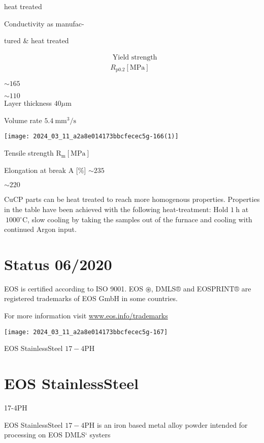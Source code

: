 \documentclass[10pt]{article}
\begin{document}
heat treated

Conductivity as manufac-

tured \& heat treated

$$
\begin{aligned}
& \text { Yield strength } \\
& R_{\mathrm{p} 0.2}[\mathrm{MPa}]
\end{aligned}
$$

$\sim 165$

$\sim 110$\\
Layer thickness $40 \mu \mathrm{m}$

Volume rate $5.4 \mathrm{~mm}^{3} / \mathrm{s}$

\begin{center}
\texttt{[image: 2024\_03\_11\_a2a8e014173bbcfecec5g-166(1)]}
\end{center}

Tensile strength $\mathrm{R}_{\mathrm{m}}[\mathrm{MPa}]$

Elongation at break A [\%] $\sim 235$

$\sim 220$

CuCP parts can be heat treated to reach more homogenous properties. Properties in the table have been achieved with the following heat-treatment: Hold $1 \mathrm{~h}$ at $~ 1000{ }^{\circ} \mathrm{C}$, slow cooling by taking the samples out of the furnace and cooling with continued Argon input.

\section*{Status 06/2020}
EOS is certified according to ISO 9001. EOS $\circledast$, DMLS® and EOSPRINT® are registered trademarks of EOS GmbH in some countries.

For more information visit \href{http://www.eos.info/trademarks}{www.eos.info/trademarks}

\begin{center}
\texttt{[image: 2024\_03\_11\_a2a8e014173bbcfecec5g-167]}
\end{center}

EOS StainlessSteel $17-4 \mathrm{PH}$

\section*{EOS StainlessSteel}
17-4PH

EOS StainlessSteel $17-4 \mathrm{PH}$ is an iron based metal alloy powder intended for processing on EOS DMLS` systers
\end{document}
